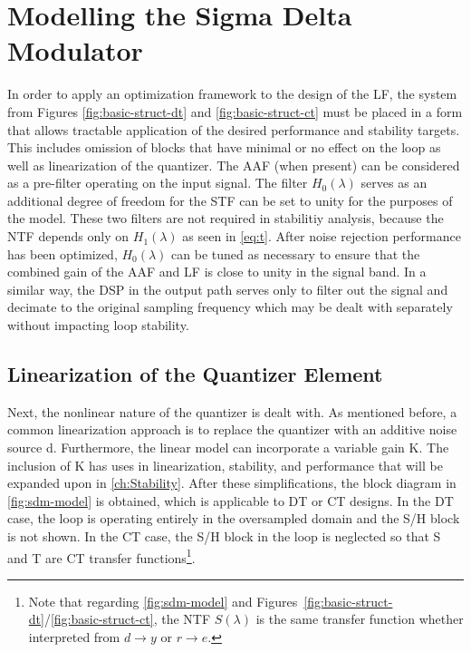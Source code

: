 
\chapter{Modelling the Sigma Delta Modulator}
\label{ch:Modelling}

In order to apply an optimization framework to the design of the \gls{LF}, the system from Figures \ref{fig:basic-struct-dt} and \ref{fig:basic-struct-ct} must be placed in a form that allows tractable application of the desired performance and stability targets. This includes omission of blocks that have minimal or no effect on the loop as well as linearization of the quantizer. The \gls{AAF} (when present) can be considered as a pre-filter operating on the input signal. The filter $H_0(\lambda)$ serves as an additional degree of freedom for the \gls{STF} can be set to unity for the purposes of the model. These two filters are not required in stabilitiy analysis, because the \gls{NTF} depends only on $H_1(\lambda)$ as seen in \autoref{eq:t}. After noise rejection performance has been optimized, $H_0(\lambda)$ can be tuned as necessary to ensure that the combined gain of the \gls{AAF} and \gls{LF} is close to unity in the signal band. In a similar way, the \gls{DSP} in the output path serves only to filter out the signal and decimate to the original sampling frequency which may be dealt with separately without impacting loop stability.

\section{Linearization of the Quantizer Element}
\label{sec:model-linq}

Next, the nonlinear nature of the quantizer is dealt with. As mentioned before, a common linearization approach is to replace the quantizer with an additive noise source \gls{d}. Furthermore, the linear model can incorporate a variable gain \gls{K}. The inclusion of \gls{K} has uses in linearization, stability, and performance that will be expanded upon in \autoref{ch:Stability}. After these simplifications, the block diagram in \autoref{fig:sdm-model} is obtained, which is applicable to \gls{DT} or \gls{CT} designs. In the \gls{DT} case, the loop is operating entirely in the oversampled domain and the \gls{S/H} block is not shown. In the \gls{CT} case, the \gls{S/H} block in the loop is neglected so that \gls{S} and \gls{T} are \gls{CT} transfer functions\footnote{Note that regarding \autoref{fig:sdm-model} and Figures~\ref{fig:basic-struct-dt}/\ref{fig:basic-struct-ct}, the \gls{NTF} $S(\lambda)$ is the same transfer function whether interpreted from $d \rightarrow y$ or $r \rightarrow e$.}.


